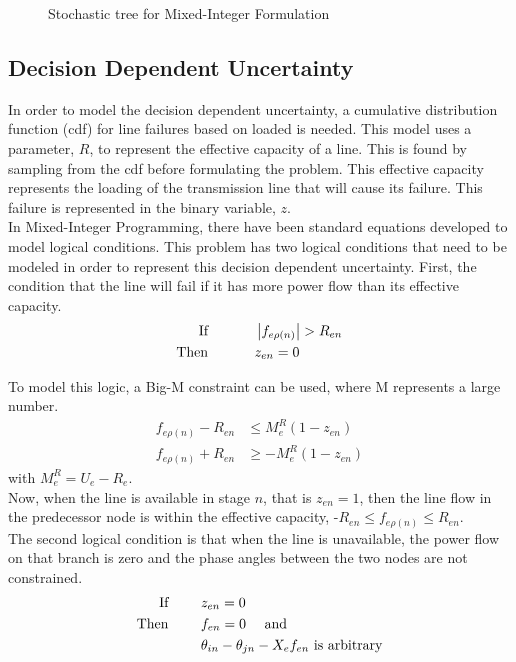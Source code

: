 \begin{figure}
\centering

\caption{Stochastic tree for Mixed-Integer Formulation}
  \label{fig:mip}
\end{figure}


\subsection{Decision Dependent Uncertainty}
In order to model the decision dependent uncertainty, a cumulative distribution function (cdf) for line failures based on loaded is needed.  This model uses a parameter, $R$, to represent the effective capacity of a line.  This is found by sampling from the cdf before formulating the problem.  This effective capacity represents the loading of the transmission line that will cause its failure.  This failure is represented in the binary variable, $z$. \\

In Mixed-Integer Programming, there have been standard equations developed to model logical conditions.  This problem has two logical conditions that need to be modeled in order to represent this decision dependent uncertainty.  First, the condition that the line will fail if it has more power flow than its effective capacity.
\begin{align*}
\mbox{If }
		\hspace{30px}&\left| f_{e\rho(n)} \right| > R_{en}  \\
\mbox{Then }
		\hspace{30px}&z_{en} = 0
\end{align*}

To model this logic, a Big-M constraint can be used, where M represents a large number.
\begin{align}
	f_{e\rho(n)} - R_{en} &\le M^R_e (1-z_{en})	\label{r1}\\
	f_{e\rho(n)} + R_{en} &\ge - M^R_e (1-z_{en})	\label{r2}
\end{align}
with $M^R_e = U_e - R_e$. \\

Now, when the line is available in stage $n$, that is $z_{en} = 1$, then the line flow in the predecessor node is within the effective capacity, -$R_{en} \le f_{e\rho(n)} \le R_{en}$.		\\

The second logical condition is that when the line is unavailable, the power flow on that branch is zero and the phase angles between the two nodes are not constrained. 
\begin{align*}
\mbox{If }
		\hspace{20px}&z_{en} = 0	\\
\mbox{Then }
		\hspace{20px}&f_{en} = 0  \hspace{10px} \mbox{ and}\\
				&\theta_{in} - \theta_{jn} - X_{e}f_{en} \mbox{ is arbitrary}
\end{align*}	

